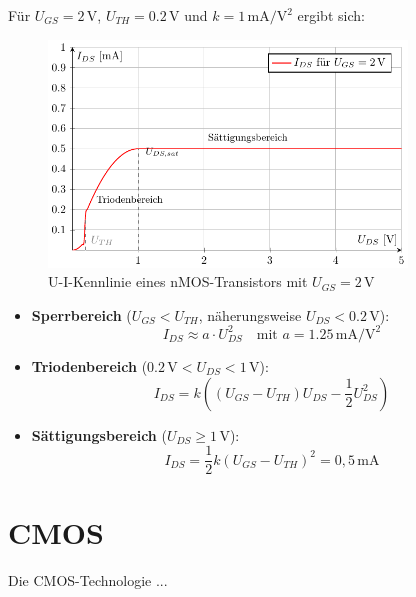 \documentclass[oneside]{scrarticle}
\numberwithin{equation}{section}
\begin{document}
Für \( U_{GS} = 2\,\mathrm{V} \), \( U_{TH} = 0.2\,\mathrm{V} \) und \( k = 1\,\mathrm{mA/V^2} \) ergibt sich:
\begin{figure}[h]
	\centering
	\includegraphics[width=0.85\textwidth]{tkiz/ui-kennlinie.pdf}
	\caption{U-I-Kennlinie eines nMOS-Transistors mit $U_{GS} = 2\,\mathrm{V}$}
	\label{fig:kennlinie}
\end{figure}
\begin{itemize}
	\item \textbf{Sperrbereich} ($U_{GS} < U_{TH}$, näherungsweise $U_{DS} < 0.2\,\mathrm{V}$): \\
	\[
	I_{DS} \approx a \cdot U_{DS}^2 \quad \text{mit } a = 1.25\,\mathrm{mA/V^2}
	\]
	\item \textbf{Triodenbereich} ($0.2\,\mathrm{V} < U_{DS} < 1\,\mathrm{V}$): \\
	\[
	I_{DS} = k \left((U_{GS} - U_{TH}) U_{DS} - \frac{1}{2} U_{DS}^2\right)
	\]
	\item \textbf{Sättigungsbereich} ($U_{DS} \ge 1\,\mathrm{V}$): \\
	\[
	I_{DS} = \frac{1}{2} k (U_{GS} - U_{TH})^2 = 0{,}5\,\mathrm{mA}
	\]
\end{itemize}

\section{CMOS}
Die CMOS-Technologie ...
\end{document}
